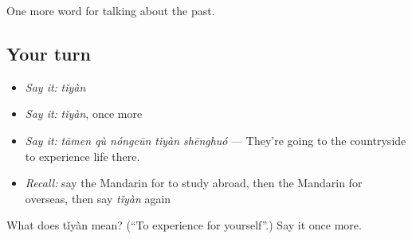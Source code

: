 \begin{grammarlens}[title={What you've built}]
One more word for talking about the past.
\end{grammarlens}

\subsection*{Your turn}
\begin{itemize}
\raggedright
  \item \emph{Say it:} \emph{tǐyàn}
  \item \emph{Say it:} \emph{tǐyàn}, once more
  \item \emph{Say it:} \emph{tāmen qù nóngcūn tǐyàn shēnghuó} — They're going to the countryside to experience life there.
  \item \emph{Recall:} say the Mandarin for to study abroad, then the Mandarin for overseas, then say \emph{tǐyàn} again
\end{itemize}

\begin{tcolorbox}[breakable,colback=teal!4,colframe=teal!35!black,title={Before you move on}]
What does tǐyàn mean? (\textquotedblleft{}To experience for yourself\textquotedblright{}.) Say it once more.
\end{tcolorbox}
